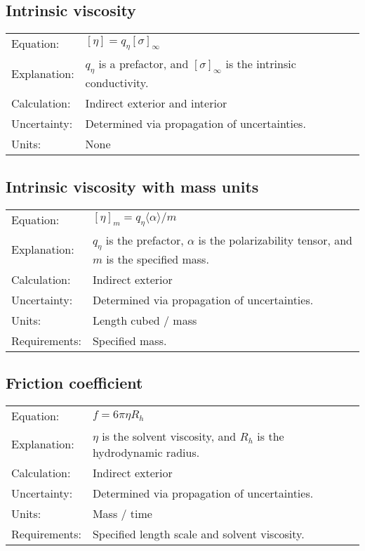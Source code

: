 \documentclass[12pt,letterpaper]{article}
\begin{document}
\subsection{Intrinsic viscosity}
\begin{tabular}{p{1in} p{5.5in}}
Equation: & $[\eta]=q_\eta [\sigma]_\infty$  \\
Explanation: &  $q_\eta$ is a prefactor, and $[\sigma]_\infty$ is the intrinsic conductivity.\\
Calculation: & Indirect exterior and interior  \\
Uncertainty:& Determined via propagation of uncertainties.\\
Units: & None \\
\end{tabular}

\subsection{Intrinsic viscosity with mass units}
\begin{tabular}{p{1in} p{5.5in}}
Equation: & $[\eta]_{m}=q_\eta \langle\alpha\rangle/m$  \\
Explanation: &  $q_\eta$ is the prefactor,  $\alpha$ is the polarizability tensor, and $m$ is the specified mass.\\
Calculation: & Indirect exterior  \\
Uncertainty:& Determined via propagation of uncertainties.\\
Units: & Length cubed / mass \\
Requirements: & Specified mass. \\
\end{tabular}


\subsection{Friction coefficient}
\begin{tabular}{p{1in} p{5.5in}}
Equation: & $f = 6\pi\eta R_h$  \\
Explanation: &  $\eta$ is the solvent viscosity, and $R_h$ is the hydrodynamic radius.\\
Calculation: & Indirect exterior  \\
Uncertainty:& Determined via propagation of uncertainties.\\
Units: & Mass / time \\
Requirements: & Specified length scale and solvent viscosity.\\
\end{tabular}
\end{document}
